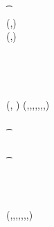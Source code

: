 \begin{figure}
\begin{center}
{\begin{varwidth}{\textwidth}
{            \t \pcreturn \cnstFalsum \\
            (\funStar{\varBlindingFactorBob},\varNonceBob) \sample \cnstIntegersPrimeWithoutZero{\varPrime} \\
            (\varCoinOutBob,\varProofBob) \opFunResult \procCreateCoin{\varFundValue}{\funStar{\varBlindingFactorBob}} \\
            \varSecKeyBob \opAssign \funStar{\varBlindingFactorBob} \\
            \varSigContext \opFunResult \procSetupCtx{\varSigContext}{\funGen{\varSecKeyBob}}{\funGen{\varNonceBob}} \\
            \varSigBob \opFunResult {} \\
            \varPreTx \opFunResult \procCreatePreTx{\varMsg}{\varInputs}{\varOutputs \opConc \varCoinOutBob}{\varProofs \opConc \varProofBob}{\varSigContext}{\varCommits \opConc \funGen{\varSecKeyBob}}{\varSigBob}{\varTime} \\
            \pcreturn (\varPreTx, \funStar{\varBlindingFactorBob})
            }
            \procedure[linenumbering]{$\procFinTx{\varPreTx}{\varSecKeyAlice}{\varNonceAlice}$} {
            (\varMsg,\varInputs,\varOutputs,\varProofs,\varSigContext,\varCommits,\varSigBob,\varTime) \opFunResult \varPreTx \\
            \pcif \procVerfProof{\varProofs[1]}{\varOutputs[1]}  \\
            \t \pcreturn \cnstFalsum \\
            \pcif \procVerfPtSig{\varSigBob}{\varMsg}{\varCommits[1]}  \\
            \t \pcreturn \cnstFalsum \\
            \varSigAlice \opFunResult \procSignPrt{\varMsg}{\varSecKeyAlice}{\varNonceAlice}{\varSigContext} \\
            \varSigFin \opFunResult \procFinSig{\varSigAlice}{\varSigBob} \\
            \varTx \opFunResult \procCreatePreTx{\varMsg}{\varInputs}{\varOutputs}{\varProofs}{\varSigContext}{\varCommits}{\varSigFin}{\varTime} \\
            \pcreturn \varTx
            }
            \procedure[linenumbering]{$\procVerfTx{\varTx}$} {
            (\varMsg,\varInputs,\varOutputs,\varProofs,\varSigContext,\varCommits,\varSignature,\varTime) \opFunResult \varTx \\
            \pcif \funLength{\varOutputs}  \opOr \funLength{\varInputs}  \\
}
\end{varwidth}}
\end{center}
\end{figure}
